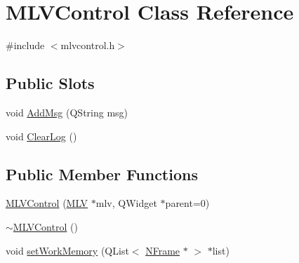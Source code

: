 \hypertarget{class_m_l_v_control}{
\section{MLVControl Class Reference}
\label{class_m_l_v_control}
}


{\ttfamily \#include $<$mlvcontrol.h$>$}

\subsection*{Public Slots}
\begin{DoxyCompactItemize}
\item 
void \hyperlink{class_m_l_v_control_aab62cd791f1ce1554c8ea9b24448b8eb}{AddMsg} (QString msg)
\item 
void \hyperlink{class_m_l_v_control_a351e4f3f9d2d509ef15f63058f83c85d}{ClearLog} ()
\end{DoxyCompactItemize}
\subsection*{Public Member Functions}
\begin{DoxyCompactItemize}
\item 
\hyperlink{class_m_l_v_control_a49daca0c74b81f3c33bb85c3478fed3d}{MLVControl} (\hyperlink{class_m_l_v}{MLV} $\ast$mlv, QWidget $\ast$parent=0)
\item 
\hyperlink{class_m_l_v_control_a5fe474b6748010f35ef0a0ed02d293a4}{$\sim$MLVControl} ()
\item 
void \hyperlink{class_m_l_v_control_a75f1c90dc65c200460402cf1ca416170}{setWorkMemory} (QList$<$ \hyperlink{class_n_frame}{NFrame} $\ast$ $>$ $\ast$list)
\end{DoxyCompactItemize}


